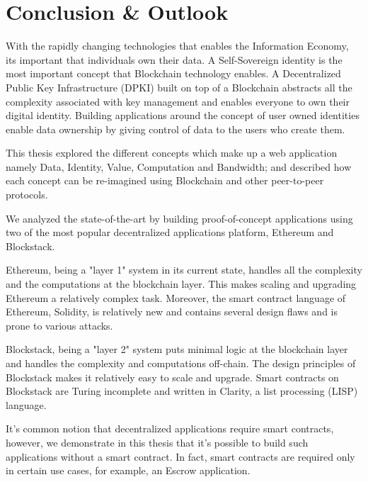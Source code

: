 \chapter{Conclusion \& Outlook}\label{chapter::conclusion}
	With the rapidly changing technologies that enables the Information Economy, its important that individuals own their data. A Self-Sovereign identity is the most important concept that Blockchain technology enables. A Decentralized Public Key Infrastructure (DPKI) built on top of a Blockchain abstracts all the complexity associated with key management and enables everyone to own their digital identity. Building applications around the concept of user owned identities enable data ownership by giving control of data to the users who create them.
	
	This thesis explored the different concepts which make up a web application namely Data, Identity, Value, Computation and Bandwidth; and described how each concept can be re-imagined using Blockchain and other peer-to-peer protocols.
	
	We analyzed the state-of-the-art by building proof-of-concept applications using two of the most popular decentralized applications platform, Ethereum and Blockstack. 
	
	Ethereum, being a "layer 1" system in its current state, handles all the complexity and the computations at the blockchain layer. This makes scaling and upgrading Ethereum a relatively complex task. Moreover, the smart contract language of Ethereum, Solidity, is relatively new and contains several design flaws and is prone to various attacks.
	
	Blockstack, being a "layer 2" system puts minimal logic at the blockchain layer and handles the complexity and computations off-chain. The design principles of Blockstack makes it relatively easy to scale and upgrade. Smart contracts on Blockstack are Turing incomplete and written in Clarity, a list processing (LISP) language.
	
	It's common notion that decentralized applications require smart contracts, however, we demonstrate in this thesis that it's possible to build such applications without a smart contract. In fact, smart contracts are required only in certain use cases, for example, an Escrow application.
